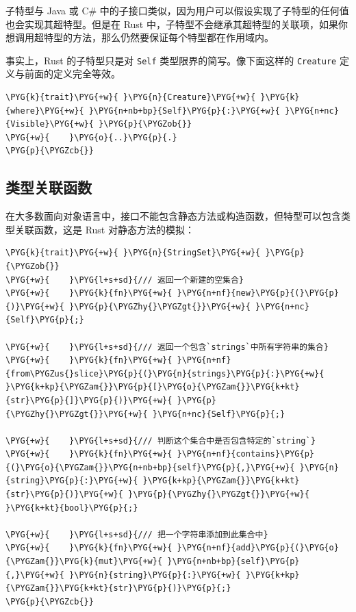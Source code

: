 子特型与 Java 或 C\# 中的子接口类似，因为用户可以假设实现了子特型的任何值也会实现其超特型。但是在 Rust 中，子特型不会继承其超特型的关联项，如果你想调用超特型的方法，那么仍然要保证每个特型都在作用域内。

事实上，Rust 的子特型只是对 \texttt{Self} 类型限界的简写。像下面这样的 \texttt{Creature} 定义与前面的定义完全等效。

\begin{Verbatim}[commandchars=\\\{\},breaklines=true,breakanywhere=true,fontsize=\codefont,xleftmargin=17bp]
\PYG{k}{trait}\PYG{+w}{ }\PYG{n}{Creature}\PYG{+w}{ }\PYG{k}{where}\PYG{+w}{ }\PYG{n+nb+bp}{Self}\PYG{p}{:}\PYG{+w}{ }\PYG{n+nc}{Visible}\PYG{+w}{ }\PYG{p}{\PYGZob{}}
\PYG{+w}{    }\PYG{o}{..}\PYG{p}{.}
\PYG{p}{\PYGZcb{}}
\end{Verbatim}

\subsection{类型关联函数}

在大多数面向对象语言中，接口不能包含静态方法或构造函数，但特型可以包含类型关联函数，这是 Rust 对静态方法的模拟：

\begin{Verbatim}[commandchars=\\\{\},breaklines=true,breakanywhere=true,fontsize=\codefont,xleftmargin=17bp]
\PYG{k}{trait}\PYG{+w}{ }\PYG{n}{StringSet}\PYG{+w}{ }\PYG{p}{\PYGZob{}}
\PYG{+w}{    }\PYG{l+s+sd}{/// 返回一个新建的空集合}
\PYG{+w}{    }\PYG{k}{fn}\PYG{+w}{ }\PYG{n+nf}{new}\PYG{p}{(}\PYG{p}{)}\PYG{+w}{ }\PYG{p}{\PYGZhy{}\PYGZgt{}}\PYG{+w}{ }\PYG{n+nc}{Self}\PYG{p}{;}

\PYG{+w}{    }\PYG{l+s+sd}{/// 返回一个包含`strings`中所有字符串的集合}
\PYG{+w}{    }\PYG{k}{fn}\PYG{+w}{ }\PYG{n+nf}{from\PYGZus{}slice}\PYG{p}{(}\PYG{n}{strings}\PYG{p}{:}\PYG{+w}{ }\PYG{k+kp}{\PYGZam{}}\PYG{p}{[}\PYG{o}{\PYGZam{}}\PYG{k+kt}{str}\PYG{p}{]}\PYG{p}{)}\PYG{+w}{ }\PYG{p}{\PYGZhy{}\PYGZgt{}}\PYG{+w}{ }\PYG{n+nc}{Self}\PYG{p}{;}

\PYG{+w}{    }\PYG{l+s+sd}{/// 判断这个集合中是否包含特定的`string`}
\PYG{+w}{    }\PYG{k}{fn}\PYG{+w}{ }\PYG{n+nf}{contains}\PYG{p}{(}\PYG{o}{\PYGZam{}}\PYG{n+nb+bp}{self}\PYG{p}{,}\PYG{+w}{ }\PYG{n}{string}\PYG{p}{:}\PYG{+w}{ }\PYG{k+kp}{\PYGZam{}}\PYG{k+kt}{str}\PYG{p}{)}\PYG{+w}{ }\PYG{p}{\PYGZhy{}\PYGZgt{}}\PYG{+w}{ }\PYG{k+kt}{bool}\PYG{p}{;}

\PYG{+w}{    }\PYG{l+s+sd}{/// 把一个字符串添加到此集合中}
\PYG{+w}{    }\PYG{k}{fn}\PYG{+w}{ }\PYG{n+nf}{add}\PYG{p}{(}\PYG{o}{\PYGZam{}}\PYG{k}{mut}\PYG{+w}{ }\PYG{n+nb+bp}{self}\PYG{p}{,}\PYG{+w}{ }\PYG{n}{string}\PYG{p}{:}\PYG{+w}{ }\PYG{k+kp}{\PYGZam{}}\PYG{k+kt}{str}\PYG{p}{)}\PYG{p}{;}
\PYG{p}{\PYGZcb{}}
\end{Verbatim}

